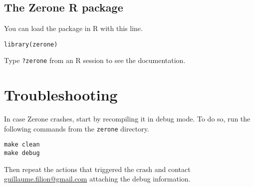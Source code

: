 \documentclass[12pt]{article}
\begin{document}
\subsection*{The Zerone R package}

You can load the package in R with this line.

\begin{verbatim}
library(zerone)
\end{verbatim}

Type \texttt{?zerone} from an R session to see the documentation.

\section{Troubleshooting}

In case Zerone crashes, start by recompiling it in debug mode. To do so,
run the following commands from the \texttt{zerone} directory.

\begin{verbatim}
make clean
make debug
\end{verbatim}

Then repeat the actions that triggered the crash and contact
\href{mailto:guillaume.filion@gmail.com}{guillaume.filion@gmail.com}
attaching the debug information.
\end{document}
